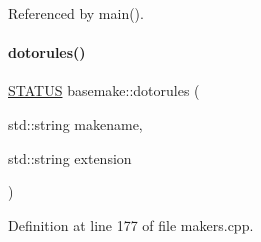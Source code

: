 Referenced by main().

\mbox{\label{namespacebasemake_a63c4ae79b21dd71b111589322b888167}} 
\paragraph{\texorpdfstring{dotorules()}{dotorules()}}
{\footnotesize\ttfamily \mbox{\hyperlink{functions_8h_a32c27cc471df37f4fc818d65de0a56c4}{S\+T\+A\+T\+US}} basemake\+::dotorules (\begin{DoxyParamCaption}\item[{std\+::string}]{makename,  }\item[{std\+::string}]{extension }\end{DoxyParamCaption})}



Definition at line 177 of file makers.\+cpp.



